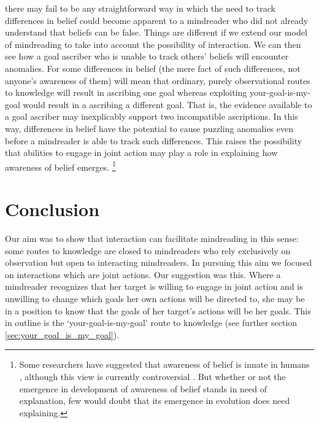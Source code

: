 \documentclass[14pt,a4paper]{extarticle}
\begin{document}
there may fail to be any straightforward way in which
the need to track differences in belief 
could become apparent to a mindreader who did not already understand that beliefs can be false.
Things are different
if we extend our model of mindreading
to take into account the possibility of interaction.
We can then see how
a goal ascriber who is unable to track others' beliefs
will encounter anomalies.
For some differences in belief 
(the mere fact of such differences, not anyone's awareness of them)
will mean that
 ordinary, purely observational routes to knowledge will result in ascribing one goal
 whereas
 exploiting your-goal-is-my-goal would result in a ascribing a different goal.
That is, the evidence available to a goal ascriber may inexplicably support two incompatible ascriptions. 
In this way,
differences in belief have the potential to cause puzzling anomalies
even before a mindreader is able to track such differences.
This 
raises the possibility
that abilities to engage in joint action
may play a role in explaining how  awareness of belief emerges.%
\footnote{
Some researchers have suggested that awareness of belief is innate in humans
\citep{Leslie:1998nq,Leslie:2005ef,Baillargeon:gx},
although this view is currently controversial
\citep{Apperly:2009ju,Ruffman:2005yl}.
But whether or not the emergence in development of awareness of belief stands in need of explanation,
few would doubt that its emergence in evolution does need explaining.
}




\section{Conclusion}
Our aim was to show that interaction can facilitate mindreading in this sense:
some routes to knowledge are closed to mindreaders who rely exclusively on observation
but
open to interacting mindreaders.
In pursuing this aim we focused on interactions which are joint actions.
Our suggestion was this.
Where a mindreader recognizes that her target is willing to engage in joint action
and is unwilling to change which goals her own actions will be directed to,
she may be in a position to know
that the goals of her target's actions will be her goals.
This in outline is the `your-goal-is-my-goal' route to  knowledge (see further section \vref{sec:your_goal_is_my_goal}).


\end{document}
